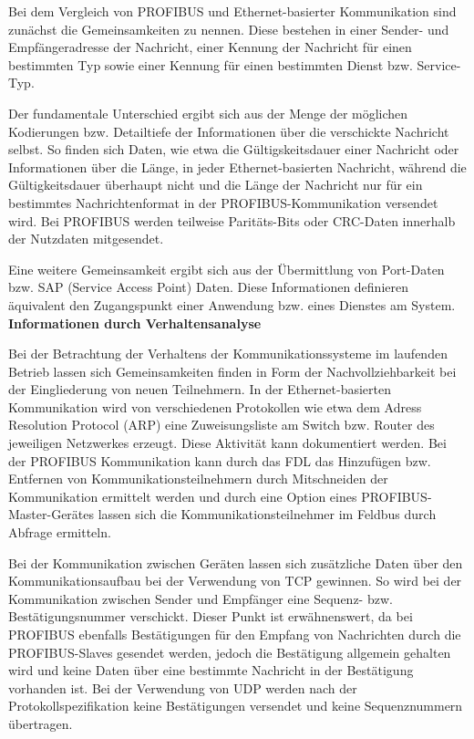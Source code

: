 Bei dem Vergleich von PROFIBUS und Ethernet-basierter Kommunikation sind zunächst die Gemeinsamkeiten zu nennen. Diese bestehen in einer Sender- und Empfängeradresse der Nachricht, einer Kennung der Nachricht für einen bestimmten Typ sowie einer Kennung für einen bestimmten Dienst bzw. Service-Typ. 

Der fundamentale Unterschied ergibt sich aus der Menge der möglichen Kodierungen bzw. Detailtiefe der Informationen über die verschickte Nachricht selbst. So finden sich Daten, wie etwa die Gültigskeitsdauer einer Nachricht oder Informationen über die Länge, in jeder Ethernet-basierten Nachricht, während die Gültigkeitsdauer überhaupt nicht und die Länge der Nachricht nur für ein bestimmtes Nachrichtenformat in der PROFIBUS-Kommunikation versendet wird. Bei PROFIBUS werden teilweise Paritäts-Bits oder CRC-Daten innerhalb der Nutzdaten mitgesendet. 

Eine weitere Gemeinsamkeit ergibt sich aus der Übermittlung von Port-Daten bzw. SAP (Service Access Point) Daten. Diese Informationen definieren äquivalent den Zugangspunkt einer Anwendung bzw. eines Dienstes am System.\\

\textbf{Informationen durch Verhaltensanalyse}

Bei der Betrachtung der Verhaltens der Kommunikationssysteme im laufenden Betrieb lassen sich Gemeinsamkeiten finden in Form der Nachvollziehbarkeit bei der Eingliederung von neuen Teilnehmern. In der Ethernet-basierten Kommunikation wird von verschiedenen Protokollen wie etwa dem Adress Resolution Protocol (ARP) eine Zuweisungsliste am Switch bzw. Router des jeweiligen Netzwerkes erzeugt. Diese Aktivität kann dokumentiert werden. Bei der PROFIBUS Kommunikation kann durch das FDL das Hinzufügen bzw. Entfernen von Kommunikationsteilnehmern durch Mitschneiden der Kommunikation ermittelt werden und durch eine Option eines PROFIBUS-Master-Gerätes lassen sich die Kommunikationsteilnehmer im Feldbus durch Abfrage ermitteln. 

Bei der Kommunikation zwischen Geräten lassen sich zusätzliche Daten über den Kommunikationsaufbau bei der Verwendung von TCP gewinnen. So wird bei der Kommunikation zwischen Sender und Empfänger eine Sequenz- bzw. Bestätigungsnummer verschickt. Dieser Punkt ist erwähnenswert, da bei PROFIBUS ebenfalls Bestätigungen für den Empfang von Nachrichten durch die PROFIBUS-Slaves gesendet werden, jedoch die Bestätigung allgemein gehalten wird und keine Daten über eine bestimmte Nachricht in der Bestätigung vorhanden ist. Bei der Verwendung von UDP werden nach der Protokollspezifikation keine Bestätigungen versendet und keine Sequenznummern übertragen.

